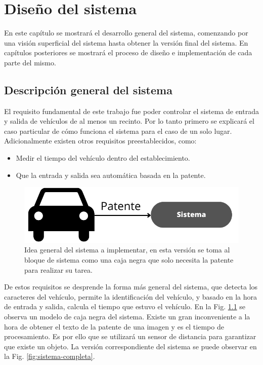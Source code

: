 \chapter{Diseño del sistema}

En este capítulo se mostrará el desarrollo general del sistema, comenzando por una visión superficial del sistema hasta obtener la versión final del sistema. En capítulos posteriores se mostrará el proceso de diseño e implementación de cada parte del mismo.

\section{Descripción general del sistema}

El requisito fundamental de este trabajo fue poder controlar el sistema de entrada y salida de vehículos de al menos un recinto. Por lo tanto primero se explicará el caso particular de cómo funciona el sistema para el caso de un solo lugar. Adicionalmente existen otros requisitos preestablecidos, como:

\begin{itemize}
    \item Medir el tiempo del vehículo dentro del establecimiento.
    \item Que la entrada y salida sea automática basada en la patente.
\end{itemize}

\begin{figure}[bth]
    \centering
    \includegraphics[width=.8\textwidth]{imgs/sistema-base.png}
    \caption[Modelo de caja negra del sistema.]{Idea general del sistema a implementar, en esta versión se toma al bloque de sistema como una caja negra que solo necesita la patente para realizar su tarea.}
    \label{fig:sistema-base}
\end{figure}

De estos requisitos se desprende la forma más general del sistema, que detecta los caracteres del vehículo, permite la identificación del vehículo, y basado en la hora de entrada y salida, calcula el tiempo que estuvo el vehículo. En la Fig. \ref{fig:sistema-base} se observa un modelo de caja negra del sistema.
Existe un gran inconveniente a la hora de obtener el texto de la patente de una imagen y es el tiempo de procesamiento. Es por ello que se utilizará un sensor de distancia para garantizar que existe un objeto.
La versión correspondiente del sistema se puede observar en la Fig. \ref{fig:sistema-completa}.

